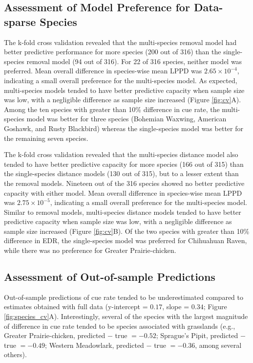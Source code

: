 \documentclass[12pt]{article}
\begin{document}
\subsection{Assessment of Model Preference for Data-sparse Species}

\par The k-fold cross validation revealed that the multi-species removal model had better predictive performance for more species (200 out of 316) than the single-species removal model (94 out of 316).
For 22 of 316 species, neither model was preferred.
Mean overall difference in species-wise mean LPPD was $2.65 \times 10^{-4}$, indicating a small overall preference for the multi-species model.
As expected, multi-species models tended to have better predictive capacity when sample size was low, with a negligible difference as sample size increased (Figure \ref{fig:cv}A).
Among the ten species with greater than 10\% difference in cue rate, the multi-species model was better for three species (Bohemian Waxwing, American Goshawk, and Rusty Blackbird) whereas the single-species model was better for the remaining seven species.

\par The k-fold cross validation revealed that the multi-species distance model also tended to have better predictive capacity for more species (166 out of 315) than the single-species distance models (130 out of 315), but to a lesser extent than the removal models.
Nineteen out of the 316 species showed no better predictive capacity with either model.
Mean overall difference in species-wise mean LPPD was $2.75 \times 10^{-5}$, indicating a small overall preference for the multi-species model.
Similar to removal models, multi-species distance models tended to have better predictive capacity when sample size was low, with a negligible difference as sample size increased (Figure \ref{fig:cv}B).
Of the two species with greater than 10\% difference in EDR, the single-species model was preferred for Chihuahuan Raven, while there was no preference for Greater Prairie-chicken.

\subsection{Assessment of Out-of-sample Predictions}

\par Out-of-sample predictions of cue rate tended to be underestimated compared to estimates obtained with full data (y-intercept = $0.17$, slope = $0.34$; Figure \ref{fig:species_cv}A).
Interestingly, several of the species with the largest magnitude of difference in cue rate tended to be species associated with grasslands (e.g., Greater Prairie-chicken, predicted $-$ true $= -0.52$; Sprague's Pipit, predicted $-$ true $= -0.49$; Western Meadowlark, predicted $-$ true $= -0.36$, among several others).
\end{document}
